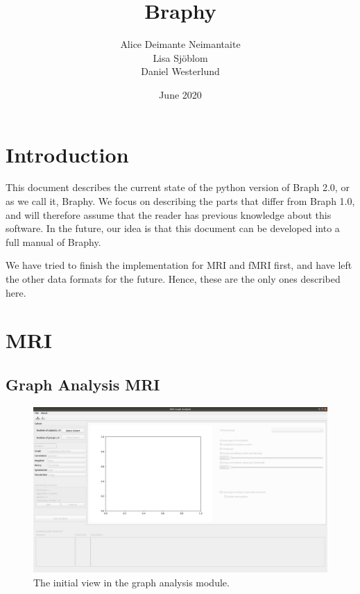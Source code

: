 \documentclass{article}
\title{Braphy}
\author{Alice Deimante Neimantaite \\ Lisa Sjöblom \\ Daniel Westerlund}
\date{June 2020}
\begin{document}
\maketitle
\clearpage

\section{Introduction}

This document describes the current state of the python version of Braph 2.0, or as we call it, Braphy. We focus on describing the parts that differ from Braph 1.0, and will therefore assume that the reader has previous knowledge about this software. In the future, our idea is that this document can be developed into a full manual of Braphy.

We have tried to finish the implementation for MRI and fMRI first, and have left the other data formats for the future. Hence, these are the only ones described here.


\section{MRI}

\subsection{Graph Analysis MRI}


\begin{figure}[h]
    \centering
    \includegraphics[width=\linewidth]{graph_analysis_locked.png}
    \caption{The initial view in the graph analysis module.}
    \label{fig:locked}
\end{figure}
\end{document}
